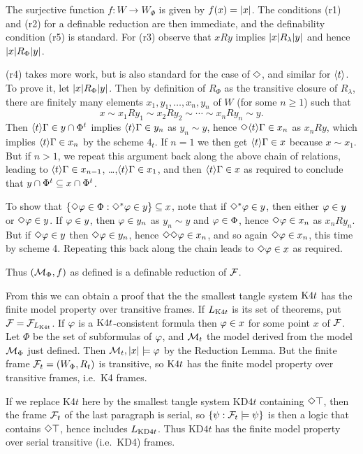 The surjective function 
$f:W\to W_\Phi$ is given by $f(x)=|x|$.
 The conditions (r1) and (r2) for a definable reduction are then immediate, and the definability condition (r5) is standard. For (r3) observe that $xRy$ implies $|x|R_\lambda|y|$ and hence $|x|R_\Phi|y|$.
 
 (r4) takes more work, but is also standard for the case of $\Diamond$, and similar for $\langle t\rangle$. To prove it,
 let  $|x|R_\Phi|y|$. Then by definition of $R_\Phi$ as the transitive closure of $R_\lambda$, there are finitely many elements $x_1,y_1,\dots,x_n,y_n$ of $W$ (for some $n\geq 1$)
such that
$$
x\sim x_1R y_1\sim x_2R y_2\sim \cdots \sim x_nR y_n\sim y.
$$
Then $\langle t\rangle\Gamma\in y\cap\Phi^t$ implies $\langle t\rangle\Gamma\in y_n$ as $y_n\sim y$, hence  $\Diamond\langle t\rangle\Gamma\in x_n$ as $x_nR y$, which implies $\langle t\rangle\Gamma\in x_n$ by the scheme $4_t$. 
If $n=1$ we then get $\langle t\rangle\Gamma\in x$  because $x\sim x_1$.
But if $n>1$, we
 repeat this argument back along the above chain of relations, leading to $\langle t\rangle\Gamma\in x_{n-1}$, \dots ,$\langle t\rangle\Gamma\in x_1$, and then $\langle t\rangle\Gamma\in x$ as required to conclude that $y\cap \Phi^t\subseteq x\cap\Phi^t$. 

To show that $\{\Diamond\varphi\in\Phi:\Diamond^*\varphi\in y\}\subseteq x$, note that if $\Diamond^*\varphi\in y$, then either $\varphi\in y$ or $\Diamond\varphi\in y$.
If $\varphi\in y$, then  $\varphi\in y_n$ as $y_n\sim y$ and $\varphi\in\Phi$, hence $\Diamond\varphi\in x_n$ as $x_nRy_n$. But if $\Diamond\varphi\in y$ then $\Diamond\varphi\in y_n$, hence $\Diamond\Diamond\varphi\in x_n$, and so again $\Diamond\varphi\in x_n$, this time by scheme 4.
Repeating this  back along the chain leads to $\Diamond\varphi\in x$ as required.
 
 Thus $(\mathcal{M}_\Phi,f)$ as defined is a definable reduction of $\mathcal{F}$.
 
 \medskip
 From this we can obtain a proof that the the smallest tangle system $\mathrm{K}4t$ has the finite model property  over transitive frames. If
  $L_{\mathrm{K}4t}$ is its set of theorems, put $\mathcal{F}=\mathcal{F}_{L_{\mathrm{K}4t}}$. If $\varphi$ is a
  $\mathrm{K}4t$-consistent formula then $\varphi\in x$ for some point $x$ of $\mathcal{F}$. Let $\Phi$ be the set of  subformulas of $\varphi$, and  $\mathcal{M}_t$  the model derived from the model $\mathcal{M}_\Phi$ just defined. Then $\mathcal{M}_t,|x|\models\varphi$ by the Reduction Lemma. But the finite frame $\mathcal{F}_t=(W_\Phi,R_t)$ is transitive, so $\mathrm{K}4t$ has the finite model property over  transitive frames, i.e.\ K4 frames.
 
 If we replace K4$t$ here by the smallest tangle system KD$4t$ containing $\Diamond\top$, then the frame $\mathcal{F}_t$ of the last paragraph is serial, so $\{\psi:\mathcal{F}_t\models\psi\}$ is then a logic that contains $\Diamond\top$, hence includes $L_{\mathrm{K}\mathrm{D}4t}$. Thus KD$4t$ has the finite model property over serial transitive  (i.e.\ KD4) frames.
 
